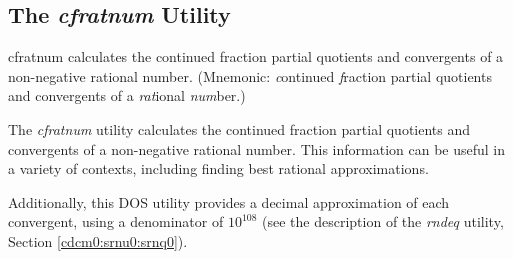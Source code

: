 \subsection{The \emph{cfratnum} Utility}
\label{cdcm0:snth0:scfr0}

\begin{dosutilcommandname}{cfratnum}%
calculates the continued fraction partial quotients and convergents
of a non-negative rational number.  (Mnemonic:  \emph{c}ontinued
\emph{f}raction partial quotients and convergents of
a \emph{rat}ional \emph{num}ber.)
\end{dosutilcommandname}

\begin{dosutilcommandsynopsis}
\end{dosutilcommandsynopsis}

\begin{dosutilcommanddescription}
The \emph{cfratnum} utility calculates the continued fraction
partial quotients and convergents of a non-negative rational number.
This information can be useful in a variety of contexts, including
finding best rational approximations.

Additionally, this DOS utility provides a decimal approximation
of each convergent, using a denominator of 
$10^{108}$ (see the description of the \emph{rndeq} utility, Section 
\ref{cdcm0:srnu0:srnq0}).
\end{dosutilcommanddescription}

